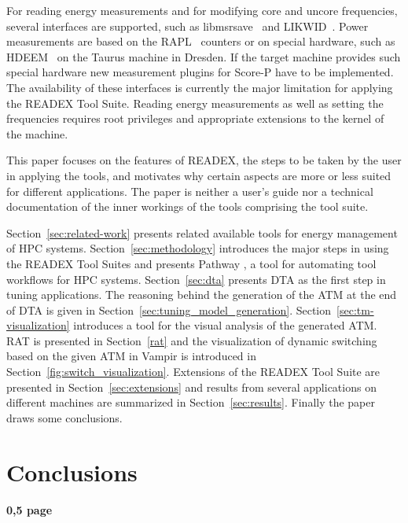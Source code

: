 \documentclass[runningheads]{llncs}
\begin{document}
For reading energy measurements and for modifying core and uncore frequencies, several interfaces are supported, such as libmsrsave~\cite{msrsave} and LIKWID~\cite{LIKWID}. Power measurements are based on the RAPL~\cite{Intel2018} counters or on special hardware, such as HDEEM~\cite{hdeem} on the Taurus machine in Dresden. If the target machine provides such special hardware new measurement plugins for Score-P have to be implemented. The availability of these interfaces is currently the major limitation for applying the READEX Tool Suite. Reading energy measurements as well as setting the frequencies requires root privileges and appropriate extensions to the kernel of the machine. 

This paper focuses on the features of READEX, the steps to be taken by the user in applying the tools, and motivates why certain aspects are more or less suited for different applications. The paper is neither a user's guide nor a technical documentation of the inner workings of the tools comprising the tool suite. 

Section~\ref{sec:related-work} presents related available tools for energy management of HPC systems. Section~\ref{sec:methodology} introduces the major steps in using the READEX Tool Suites and presents Pathway \cite{Pathway:Petkov13}, a tool for automating tool workflows for HPC systems. Section~\ref{sec:dta} presents DTA as the first step in tuning applications. The reasoning behind the generation of the ATM at the end of DTA is given in Section~\ref{sec:tuning_model_generation}. Section~\ref{sec:tm-visualization} introduces a tool for the visual analysis of the generated ATM. RAT is presented in Section~\ref{rat} and the visualization of dynamic switching based on the given ATM in Vampir is introduced in Section~\ref{fig:switch_visualization}. Extensions of the READEX Tool Suite are presented in Section~\ref{sec:extensions} and results from several applications on different machines are summarized in Section~\ref{sec:results}. Finally the paper draws some conclusions. 


















\section{Conclusions} \label{sec:conclusions}
\textbf{0,5 page}



%
 
 
\end{document}
